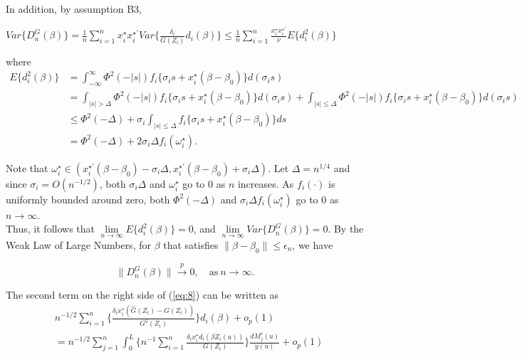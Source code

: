 \documentclass[12pt]{article}
\begin{document}
	In addition, by assumption B3,

	\begin{center}
		$Var\{D_n^{G}(\beta)\} = \frac{1}{n} \sum_{i=1}^{n} x_i^\star x_i^{\star\prime} Var \Big\{ \frac{\delta_i}{G(Z_i)} d_i(\beta) \Big\} \leq \frac{1}{n}\sum_{i=1}^{n} \frac{x_i^\star x_i^{\star\prime}}{\nu}E\{d_i^2(\beta)\}$
	\end{center}

	\noindent where
	\begin{align*}
		E\{d_i^2(\beta)\} & = \int_{-\infty}^{\infty}\Phi^2(-\lvert s \rvert)f_i\{\sigma_i s + x_i^\star(\beta - \beta_0)\}d(\sigma_i s)\\
		& = \int_{\lvert s \rvert > \Delta}\Phi^2(-\lvert s \rvert)f_i\{\sigma_i s + x_i^\star(\beta - \beta_0)\}d(\sigma_i s)+\int_{\lvert s \rvert \leq \Delta}\Phi^2(-\lvert s \rvert)f_i\{\sigma_i s + x_i^\star(\beta - \beta_0)\}d(\sigma_i s)\\
		& \leq \Phi^2(-\Delta)+\sigma_i \int_{\lvert s \rvert \leq \Delta}f_i\{\sigma_i s + x_i^\star(\beta - \beta_0)\}ds\\
		& = \Phi^2(-\Delta)+2\sigma_i\Delta f_i(\omega_i^\star).
	\end{align*}

	\noindent Note that $\omega_i^\star \in (x_i^{\star \prime}(\beta-\beta_0)-\sigma_i\Delta, x_i^{\star \prime}(\beta-\beta_0)+\sigma_i\Delta)$. Let $\Delta=n^{1/4}$ and since $\sigma_i = O(n^{-1/2})$, both $\sigma_i\Delta$ and $\omega_i^\star$ go to $0$ as $n$ increases. As $f_i(\cdot)$ is uniformly bounded around zero, both $\Phi^2(-\Delta)$ and $\sigma_i \Delta f_i(\omega_i^\star)$ go to $0$ as $n \to \infty$.\\

	Thus, it follows that $\lim\limits_{n \to \infty}E\{d_i^2(\beta)\}=0$, and $\lim\limits_{n \to \infty}Var\{D_n^G(\beta)\}=0$. By the Weak Law of Large Numbers, for $\beta$ that satisfies $\lVert \beta - \beta_0 \rVert \leq \epsilon_n$, we have
	
	\begin{equation} \label{eq:9}
		\lVert D_n^G(\beta) \rVert \xrightarrow{p} 0, \quad \text{as}\ n\to \infty.
	\end{equation}

	The second term on the right side of (\ref{eq:8}) can be written as\\
	\begin{align*}
		& n^{-1/2}\sum_{i=1}^{n} \Big\{ \frac{\delta_i x_i^\star (\hat{G}(Z_i)-G(Z_i))}{G^2(Z_i)}\Big\}d_i(\beta)+o_p(1)\\
		&= n^{-1/2}\sum_{j=1}^{n} \int_{0}^{L} \Big\{ n^{-1} \sum_{i=1}^{n} \frac{\delta_i x_i^\star d_i(\beta Z_i(u))}{G(Z_i)}\Big\} \frac{dM_j^c(u)}{y(u)}+o_p(1)
	\end{align*}
\end{document}
